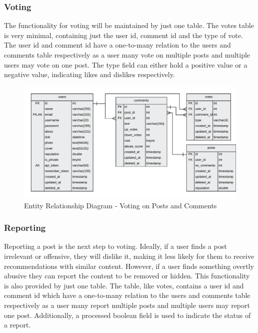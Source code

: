 \subsubsection{Voting}
The functionality for voting will be maintained by just one table. The votes table is very minimal, containing just the user id, comment id and the type of vote. The user id and comment id have a one-to-many relation to the users and comments table respectively as a user many vote on multiple posts and multiple users may vote on one post. The type field can either hold a positive value or a negative value, indicating likes and dislikes respectively.

\begin{figure}[H]
  \centering
  \includegraphics[width=1.0\textwidth]{Images/Design/Database/Votes}
  \caption{Entity Relationship Diagram - Voting on Posts and Comments} \label{fig:ERD_Voting}
\end{figure}

\subsubsection{Reporting}
Reporting a post is the next step to voting. Ideally, if a user finds a post irrelevant or offensive, they will dislike it, making it less likely for them to receive recommendations with similar content. However, if a user finds something overtly abusive they can report the content to be removed or hidden. This functionality is also provided by just one table. The table, like votes, contains a user id and comment id which have a one-to-many relation to the users and comments table respectively as a user many report multiple posts and multiple users may report one post. Additionally, a processed boolean field is used to indicate the status of a report. 

